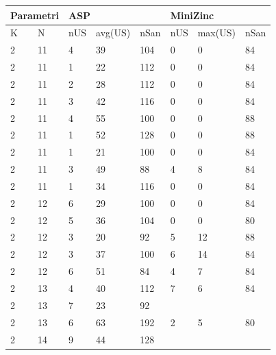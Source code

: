 \documentclass[12pt, italian, openany]{book}
\begin{document}
\begin{table}[]
\begin{tabular}{ll|lll|lll}
\multicolumn{2}{l|}{Parametri} & \multicolumn{3}{l|}{ASP} & \multicolumn{3}{l}{MiniZinc} \\ \hline
K             & N              & nUS    & avg(US)   & nSan     & nUS      & max(US)     & nSan     \\ \hline
2           & 11           & 4    & 39        & 104   & 0    & 0         & 84   \\
2           & 11           & 1    & 22        & 112   & 0    & 0         & 84   \\
2           & 11           & 2    & 28        & 112   & 0    & 0         & 84   \\
2           & 11           & 3    & 42        & 116   & 0    & 0         & 84   \\
2           & 11           & 4    & 55        & 100   & 0    & 0         & 88   \\
2           & 11           & 1    & 52        & 128   & 0    & 0         & 88   \\
2           & 11           & 1    & 21        & 100   & 0    & 0         & 84   \\
2           & 11           & 3    & 49        & 88    & 4    & 8         & 84   \\
2           & 11           & 1    & 34        & 116   & 0    & 0         & 84   \\
2           & 12           & 6    & 29        & 100   & 0    & 0         & 84   \\
2           & 12           & 5    & 36        & 104   & 0    & 0         & 80   \\
2           & 12           & 3    & 20        & 92    & 5    & 12        & 88   \\
2           & 12           & 3    & 37        & 100   & 6    & 14        & 84   \\
2           & 12           & 6    & 51        & 84    & 4    & 7         & 84   \\
2           & 13           & 4    & 40        & 112   & 7    & 6         & 84   \\
2           & 13           & 7    & 23        & 92    &      &           &      \\
2           & 13           & 6    & 63        & 192   & 2    & 5         & 80   \\
2           & 14           & 9    & 44        & 128   &      &           &      \\

\end{tabular}
\end{table}
\end{document}
